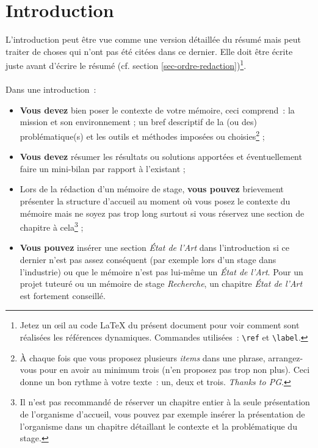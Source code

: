 \documentclass[a4paper, 12pt]{book}
\begin{document}
\chapter*{Introduction}
L'introduction peut être vue comme une version détaillée du résumé
mais peut traiter de choses qui n'ont pas été citées dans ce
dernier. Elle doit être écrite juste avant d'écrire le résumé
(cf. section \ref{sec-ordre-redaction})\footnote{Jetez un \oe{}il au
  code \LaTeX{} du présent document pour voir comment sont réalisées
  les références dynamiques. Commandes utilisées~:
  \texttt{\textbackslash{}ref} et
  \texttt{\textbackslash{}label}.}.\\~\\ Dans une introduction~:
\begin{itemize}
\item \textbf{Vous devez} bien poser le contexte de votre mémoire,
  ceci comprend~: la mission et son environnement ; un bref descriptif
  de la (ou des) problématique(s) et les outils et méthodes imposées
  ou choisies\footnote{\`A chaque fois que vous proposez plusieurs
    \emph{items} dans une phrase, arrangez-vous pour en avoir au
    minimum trois (n'en proposez pas trop non plus). Ceci donne un bon
    rythme à votre texte~: un, deux et trois. \emph{Thanks to \sc
      PG}.} ;
\item \textbf{Vous devez} résumer les résultats ou solutions apportées
  et éventuellement faire un mini-bilan par rapport à l'existant ;
\item Lors de la rédaction d'un mémoire de stage, \textbf{vous pouvez}
  brievement présenter la structure d'accueil au moment où vous posez
  le contexte du mémoire mais ne soyez pas trop long surtout si vous
  réservez une section de chapitre à cela\footnote{Il n'est pas
    recommandé de réserver un chapitre entier à la seule présentation
    de l'organisme d'accueil, vous pouvez par exemple insérer la
    présentation de l'organisme dans un chapitre détaillant le contexte
    et la problématique du stage.} ;
\item \textbf{Vous pouvez} insérer une section \emph{\'Etat de l'Art}
  dans l'introduction si ce dernier n'est pas assez conséquent (par
  exemple lors d'un stage dans l'industrie) ou que le mémoire n'est
  pas lui-même un \emph{\'Etat de l'Art}. Pour un projet tuteuré ou un
  mémoire de stage \emph{Recherche}, un chapitre \emph{\'Etat de l'Art}
  est fortement conseillé.
\end{itemize}
\end{document}
